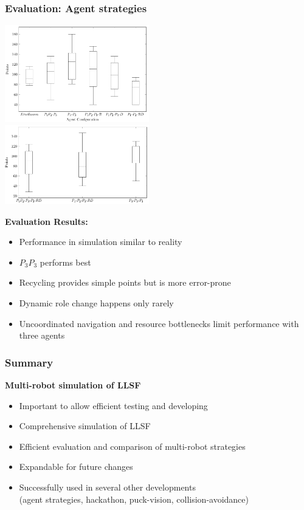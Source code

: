 \documentclass[]{beamer}
\begin{document}
\begin{frame}
  \frametitle{Evaluation: Agent strategies} %
  \begin{multicols}{2}
    \center
    \includegraphics[width=0.47\textwidth]{../pics/eval_two}\\
    \includegraphics[width=0.47\textwidth]{../pics/eval_three}\\
    \raggedright
    \textbf{\large Evaluation Results:}
    \begin{itemize}
    \item Performance in simulation similar to reality %
    \item $P_3P_3$ performs best %
    \item Recycling provides simple points but is more error-prone
    \item Dynamic role change happens only rarely
    \item Uncoordinated navigation and resource bottlenecks limit performance with three agents
    \end{itemize}
  \end{multicols}
\end{frame}


\begin{frame}
  \frametitle{Summary}
  \textbf{\large Multi-robot simulation of LLSF}
  \begin{itemize}
  \item Important to allow efficient testing and developing
  \item Comprehensive simulation of LLSF
  \item Efficient evaluation and comparison of multi-robot strategies
  \item Expandable for future changes
  \item Successfully used in several other developments\\(agent strategies, hackathon, puck-vision, collision-avoidance)
  \end{itemize}
\end{frame}
\end{document}
